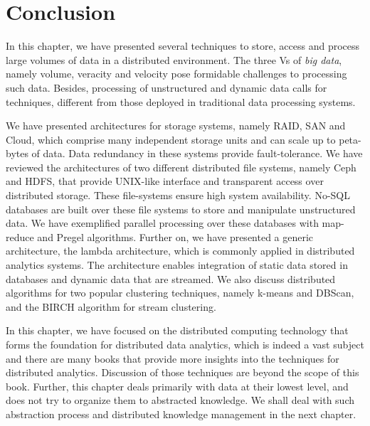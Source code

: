 \section{Conclusion}

In this chapter, we have presented several techniques to store, access and process large volumes of data in a distributed environment. 
The three Vs of {\em big data}, namely volume, veracity and velocity pose formidable challenges to processing such data. Besides,
processing of unstructured and dynamic data calls for techniques, different from those deployed in traditional data processing 
systems.

We have presented architectures for storage systems, namely RAID, SAN and Cloud, which comprise many independent storage units
and can scale up to peta-bytes of data. Data redundancy in these systems provide fault-tolerance. We have reviewed the 
architectures of two different distributed file systems, namely Ceph and HDFS, that provide UNIX-like interface and transparent 
access over distributed storage. These file-systems ensure high system availability. No-SQL databases are built over these 
file systems to store and manipulate unstructured data. We have exemplified parallel processing over these databases with
map-reduce and Pregel algorithms.
%
Further on, we have presented a generic architecture, the lambda architecture, which is commonly applied in distributed analytics 
systems. The architecture enables integration of static data stored in databases and dynamic data that are streamed. We also
discuss distributed algorithms for two popular clustering techniques, namely k-means and DBScan, and the BIRCH algorithm for
stream clustering.

In this chapter, we have focused on the distributed computing technology that forms the foundation for distributed data analytics,
which is indeed a vast subject and there are many books that provide more insights into the techniques for distributed analytics.
Discussion of those techniques are beyond the scope of this book. Further, this chapter deals primarily with data at their lowest 
level, and does not try to organize them to abstracted knowledge. We shall deal with such abstraction process and distributed knowledge 
management in the next chapter.


